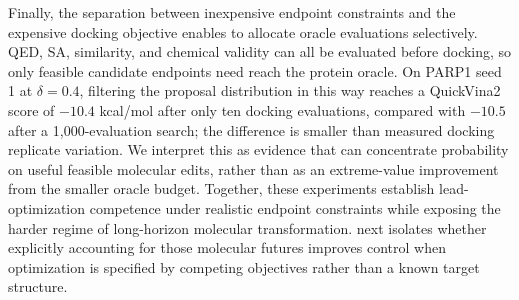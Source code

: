Finally, the separation between inexpensive endpoint constraints and the expensive docking objective enables \method{} to allocate oracle evaluations selectively. QED, SA, similarity, and chemical validity can all be evaluated before docking, so only feasible candidate endpoints need reach the protein oracle. On PARP1 seed 1 at $\delta=0.4$, filtering the proposal distribution in this way reaches a QuickVina2 score of $-10.4$ kcal/mol after only ten docking evaluations, compared with $-10.5$ after a 1{,}000-evaluation search; the difference is smaller than measured docking replicate variation. We interpret this as evidence that \method{} can concentrate probability on useful feasible molecular edits, rather than as an extreme-value improvement from the smaller oracle budget. Together, these experiments establish lead-optimization competence under realistic endpoint constraints while exposing the harder regime of long-horizon molecular transformation.  next isolates whether explicitly accounting for those molecular futures improves control when optimization is specified by competing objectives rather than a known target structure.

